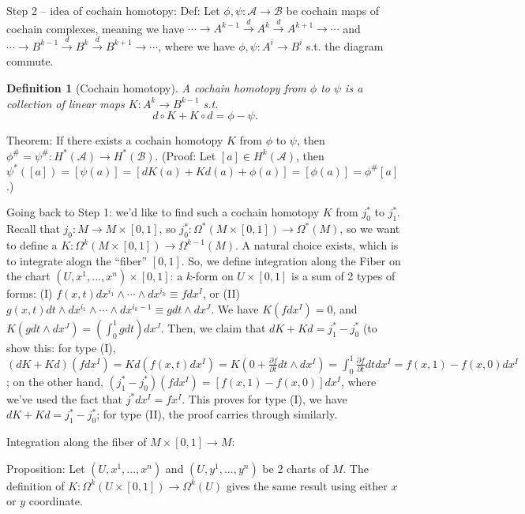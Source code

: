 \documentclass{article}
\theoremstyle{mystyle}
\newtheorem*{definition}{Definition}%
\theoremstyle{remark}
\numberwithin{equation}{section}
\begin{document}
Step 2 -- idea of cochain homotopy: Def: Let $\phi,\psi\colon \mathcal{A}\rightarrow \mathcal{B}$ be cochain maps of cochain complexes, meaning we have $\cdots \rightarrow A^{k-1}\xrightarrow{d} A^k\xrightarrow{d} A^{k+1}\rightarrow \cdots$ and $\cdots \rightarrow B^{k-1}\xrightarrow{d} B^k\xrightarrow{d} B^{k+1}\rightarrow \cdots$, where we have $\phi,\psi \colon A^i\rightarrow B^i$ s.t. the diagram commute. 


\begin{definition}[Cochain homotopy] A \emph{cochain homotopy} from $\phi$ to $\psi$ is a collection of linear maps $K\colon A^k\rightarrow B^{k-1}$ s.t. $$d\circ K + K\circ d = \phi-\psi.$$
\end{definition}

Theorem: If there exists a cochain homotopy $K$ from $\phi$ to $\psi$, then $\phi^\#=\psi^\#\colon H^*(\mathcal{A})\rightarrow H^*(\mathcal{B})$.  (Proof: Let $[a]\in H^k(\mathcal{A})$, then $\psi^*([a]) = [\psi(a)] =  [dK(a)+Kd(a)+\phi(a)] =[\phi(a)] = \phi^\#[a]$.)

Going back to Step 1: we'd like to find such a cochain homotopy $K$ from $j_0^*$ to $j_1^*$. Recall that $j_0\colon M\rightarrow M\times [0,1]$, so $j_0^*\colon \Omega^*(M\times [0,1])\rightarrow \Omega^*(M)$, so we want to define a $K\colon \Omega^k(M\times [0,1])\rightarrow \Omega^{k-1}(M)$. A natural choice exists, which is to integrate alogn the ``fiber'' $[0,1]$. So, we define integration along the Fiber on the chart $(U,x^1,...,x^n)\times [0,1]$: a $k$-form on $U\times [0,1]$ is a sum of 2 types of forms: (I) $f(x,t)d x^{i_1}\wedge\cdots\wedge d x^{i_k}\equiv f dx^I$, or (II) $g(x,t)dt \wedge dx^{i_1}\wedge \cdots \wedge dx^{i_k-1} \equiv g d t\wedge d x^J$. We have $K(f dx^I)=0$, and $K(gdt \wedge dx^J) = (\int^1_0 g dt) dx^J$. Then, we claim that $dK+Kd = j_1^*-j_0^*$ (to show this: for type (I), $(dK+Kd)(f dx^I) = K d(f(x,t)d x^I) = K(0+\frac{\partial f}{\partial t}dt\wedge  d x^I) = \int^1_0 \frac{\partial f}{\partial t}dt d x^I = f(x,1)-f(x,0)d x^I$; on the other hand, $(j_1^*-j_0^*) (f dx^I) = [f(x,1)-f(x,0)] d x^I$, where we've used the fact that $j^* dx^I = f x^I$. This proves for type (I), we have $dK+Kd = j_1^*-j_0^*$; for type (II), the proof carries through similarly. 

Integration along the fiber of $M\times [0,1]\rightarrow M$:

Proposition:   Let $(U,x^1,...,x^n)$ and $(U,y^1,...,y^n)$ be 2 charts of $M$. The definition of $K\colon \Omega^k(U\times [0,1])\rightarrow \Omega^k(U)$ gives the same result using either $x$ or $y$ coordinate.
\end{document}
